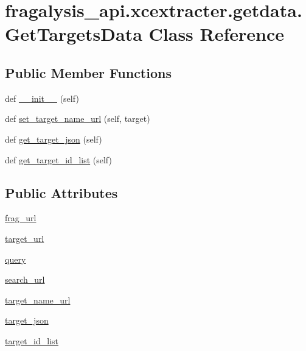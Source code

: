 \hypertarget{classfragalysis__api_1_1xcextracter_1_1getdata_1_1_get_targets_data}{}\section{fragalysis\+\_\+api.\+xcextracter.\+getdata.\+Get\+Targets\+Data Class Reference}
\label{classfragalysis__api_1_1xcextracter_1_1getdata_1_1_get_targets_data}
\subsection*{Public Member Functions}
\begin{DoxyCompactItemize}
\item 
def \hyperlink{classfragalysis__api_1_1xcextracter_1_1getdata_1_1_get_targets_data_a40260f1d84f75c354f8b1b7124732b3a}{\+\_\+\+\_\+init\+\_\+\+\_\+} (self)
\item 
def \hyperlink{classfragalysis__api_1_1xcextracter_1_1getdata_1_1_get_targets_data_abf5179a2489b7edaa16dc6bc8c89f051}{set\+\_\+target\+\_\+name\+\_\+url} (self, target)
\item 
def \hyperlink{classfragalysis__api_1_1xcextracter_1_1getdata_1_1_get_targets_data_ab67e7a9bfced7f671422ef8f4b6997c9}{get\+\_\+target\+\_\+json} (self)
\item 
def \hyperlink{classfragalysis__api_1_1xcextracter_1_1getdata_1_1_get_targets_data_af26e1f97fa431c2bb490985e7af0eb45}{get\+\_\+target\+\_\+id\+\_\+list} (self)
\end{DoxyCompactItemize}
\subsection*{Public Attributes}
\begin{DoxyCompactItemize}
\item 
\hyperlink{classfragalysis__api_1_1xcextracter_1_1getdata_1_1_get_targets_data_afa8f34da2572edae8988c21829ce9c3e}{frag\+\_\+url}
\item 
\hyperlink{classfragalysis__api_1_1xcextracter_1_1getdata_1_1_get_targets_data_a7c14c7714ad794c49aa6354d47afdeba}{target\+\_\+url}
\item 
\hyperlink{classfragalysis__api_1_1xcextracter_1_1getdata_1_1_get_targets_data_a3dffd252e6a0bbed273a8e6dbb6de886}{query}
\item 
\hyperlink{classfragalysis__api_1_1xcextracter_1_1getdata_1_1_get_targets_data_a16daab7bc18679ec7c933297616a29ca}{search\+\_\+url}
\item 
\hyperlink{classfragalysis__api_1_1xcextracter_1_1getdata_1_1_get_targets_data_a062afec53b3ec29811563ff02653de1b}{target\+\_\+name\+\_\+url}
\item 
\hyperlink{classfragalysis__api_1_1xcextracter_1_1getdata_1_1_get_targets_data_a1978182ff74a964745ff788a25760b21}{target\+\_\+json}
\item 
\hyperlink{classfragalysis__api_1_1xcextracter_1_1getdata_1_1_get_targets_data_aa58b4659be6811ef194daf3f3cab74a2}{target\+\_\+id\+\_\+list}
\end{DoxyCompactItemize}


